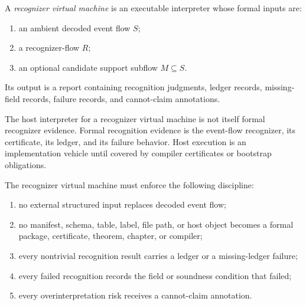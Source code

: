 \begin{definition}
\label{def:programmatic-recognizer-vm}
A \emph{recognizer virtual machine} is an executable interpreter whose formal inputs are:
\begin{enumerate}
\item an ambient decoded event flow $S$;
\item a recognizer-flow $R$;
\item an optional candidate support subflow $M\subseteq S$.
\end{enumerate}
Its output is a report containing recognition judgments, ledger records, missing-field records, failure records, and cannot-claim annotations.
\end{definition}

\begin{principle}
\label{prin:programmatic-vm-not-evidence}
The host interpreter for a recognizer virtual machine is not itself formal recognizer evidence. Formal recognition evidence is the event-flow recognizer, its certificate, its ledger, and its failure behavior. Host execution is an implementation vehicle until covered by compiler certificates or bootstrap obligations.
\end{principle}

\begin{definition}
\label{def:programmatic-recognizer-vm-discipline}
The recognizer virtual machine must enforce the following discipline:
\begin{enumerate}
\item no external structured input replaces decoded event flow;
\item no manifest, schema, table, label, file path, or host object becomes a formal package, certificate, theorem, chapter, or compiler;
\item every nontrivial recognition result carries a ledger or a missing-ledger failure;
\item every failed recognition records the field or soundness condition that failed;
\item every overinterpretation risk receives a cannot-claim annotation.
\end{enumerate}
\end{definition}

